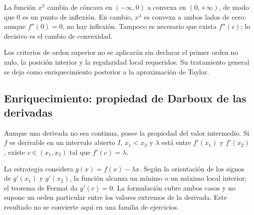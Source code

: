 La función \(x^3\) cambia de cóncava en \(( -\infty,0)\) a convexa en
\((0,+\infty)\), de modo que \(0\) es un punto de inflexión. En cambio,
\(x^4\) es convexa a ambos lados de cero: aunque \(f''(0)=0\), no hay
inflexión. Tampoco es necesario que exista \(f''(c)\); lo decisivo es el
cambio de convexidad.

Los criterios de orden superior no se aplicarán sin declarar el primer orden
no nulo, la posición interior y la regularidad local requeridos. Su tratamiento
general se deja como enriquecimiento posterior a la aproximación de Taylor.

\subsection{Enriquecimiento: propiedad de Darboux de las derivadas}

Aunque una derivada no sea continua, posee la propiedad del valor intermedio.
Si \(f\) es derivable en un intervalo abierto \(I\), \(x_1<x_2\) y
\(\lambda\) está entre \(f'(x_1)\) y \(f'(x_2)\), existe
\(c\in(x_1,x_2)\) tal que \(f'(c)=\lambda\).

La estrategia considera \(g(x)=f(x)-\lambda x\). Según la orientación de los
signos de \(g'(x_1)\) y \(g'(x_2)\), la función alcanza un mínimo o un máximo
local interior; el teorema de Fermat da \(g'(c)=0\). La formulación cubre ambos
casos y no supone un orden particular entre los valores extremos de la
derivada. Este resultado no se convierte aquí en una familia de ejercicios.
